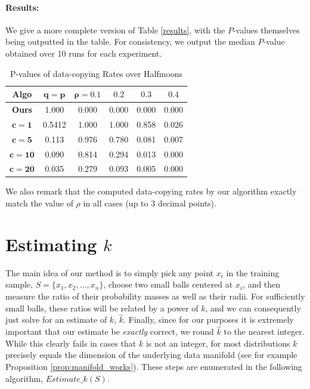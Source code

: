 \paragraph{Results:} We give a more complete version of Table \ref{results}, with the $P$-values themselves being outputted in the table. For consistency, we output the median $P$-value obtained over 10 runs for each experiment. 

\begin{table}[h]
\caption{P-values of data-copying Rates over Halfmoons} \label{results:full}
\begin{center}
\begin{tabular}{ |c||c|c|c|c|c| } 
 \hline
 \textbf{Algo} & $\mathbf{q = p}$ & $\mathbf{\rho = 0.1}$ & $\mathbf{0.2}$ & $\mathbf{0.3}$ & $\mathbf{0.4}$ \\ 
 \hline
 \hline
 \textbf{Ours} & \color{blue}1.000 & \color{red}0.000 & \color{red}0.000 & \color{red}0.000 & \color{red}0.000 \\ 
 \hline
 $\mathbf{c=1}$ & \color{blue}0.5412 & \color{blue}1.000 & \color{blue}1.000 & \color{blue}0.858 & \color{blue}0.026 \\ 
 \hline
 $\mathbf{c=5}$ & \color{blue}0.113 & \color{blue}0.976 & \color{blue}0.780 & \color{blue}0.081 & \color{red}0.007 \\ 
 \hline
 $\mathbf{c=10}$ & \color{blue}0.090 & \color{blue}0.814 & \color{blue}0.294 & \color{blue}0.013 & \color{red}0.000 \\ 
 \hline
 $\mathbf{c=20}$ & \color{blue}0.035 & \color{blue}0.279& \color{blue}0.093 & \color{red}0.005 & \color{red}0.000\\ 
 \hline
\end{tabular}
\end{center}
\end{table}

We also remark that the computed data-copying rates by our algorithm exactly match the value of $\rho$ in all cases (up to 3 decimal points).

\section{Estimating $k$}\label{sec:estimating_alpha}

The main idea of our method is to simply pick any point $x_i$ in the training sample, $S = \{x_1, x_2, \dots, x_n\}$, choose two small balls centered at $x_i$, and then measure the ratio of their probability masses as well as their radii. For sufficiently small balls, these ratios will be related by a power of $k$, and we can consequently just solve for an estimate of $k$, $\hat{k}$. Finally, since for our purposes it is extremely important that our estimate be \textit{exactly} correct, we round $\hat{k}$ to the nearest integer. While this clearly fails in cases that $k$ is not an integer, for most distributions $k$ precisely equals the dimension of the underlying data manifold (see for example Proposition \ref{prop:manifold_works}). These steps are enumerated in the following algorithm, $Estimate\_k(S)$. 

